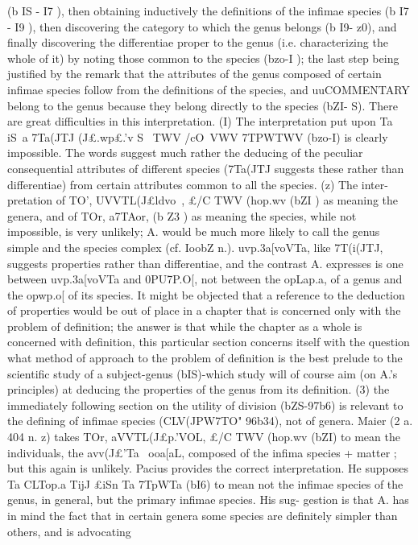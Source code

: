 {{{{{{{{{{{{{{{{{{{{{{{{{{{{{{{{{{{{{{{{{{{{{{{{{{{{{{{{{{{{{{{{(b IS - I7 ), then obtaining inductively the definitions of the infimae
species (b I7 - I9 ), then discovering the category to which the genus
belongs (b I9- z0), and finally discovering the differentiae proper
to the genus (i.e. characterizing the whole of it) by noting those
common to the species (bzo-I ); the last step being justified by
the remark that the attributes of the genus composed of certain
infimae species follow from the definitions of the species, and
uuCOMMENTARY
belong to the genus because they belong directly to the species
(bZI- S). There are great difficulties in this interpretation. (I) The
interpretation put upon Ta iS~a 7Ta(JTJ (J£.wp£.'v S~ TWV /cO~VWV
7TPWTWV (bzo-I) is clearly impossible. The words suggest much
rather the deducing of the peculiar consequential attributes of
different species (7Ta(JTJ suggests these rather than differentiae)
from certain attributes common to all the species. (z) The inter-
pretation of TO', UVVTL(J£ldvo~, £/C TWV (hop.wv (bZI ) as meaning the
genera, and of TOr, a7TAor, (b Z3 ) as meaning the species, while not
impossible, is very unlikely; A. would be much more likely to
call the genus simple and the species complex (cf. IoobZ n.).
uvp.{3a[voVTa, like 7T(i(JTJ, suggests properties rather than differentiae,
and the contrast A. expresses is one between uvp.{3a[voVTa and
0PU7P.O[, not between the opLap.a, of a genus and the opwp.o[ of
its species. It might be objected that a reference to the deduction
of properties would be out of place in a chapter that is concerned
only with the problem of definition; the answer is that while the
chapter as a whole is concerned with definition, this particular
section concerns itself with the question what method of approach
to the problem of definition is the best prelude to the scientific
study of a subject-genus (bIS)-which study will of course aim
(on A.'s principles) at deducing the properties of the genus from
its definition. (3) the immediately following section on the utility
of division (bZS-97b6) is relevant to the defining of infimae species
(CLV(JPW7TO" 96b34), not of genera.
Maier (2 a. 404 n. z) takes TOr, aVVTL(J£p.'VOL, £/C TWV (hop.wv (bZI)
to mean the individuals, the avv(J£'Ta~ ooa[aL, composed of the
infima species + matter ; but this again is unlikely.
Pacius provides the correct interpretation. He supposes Ta
CLTop.a TijJ £iSn Ta 7TpWTa (bI6) to mean not the infimae species of
the genus, in general, but the primary infimae species. His sug-
gestion is that A. has in mind the fact that in certain genera
some species are definitely simpler than others, and is advocating
}}}}}}}}}}}}}}}}}}}}}}}}}}}}}}}}}}}}}}}}}}}}}}}}}}}}}}}}}}}}}}}}}}
